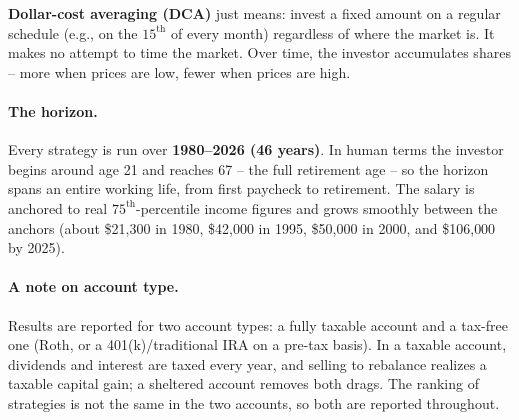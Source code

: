 \documentclass[11pt]{article}
\begin{document}
\bigskip

\textbf{Dollar-cost averaging (DCA)} just means: invest a fixed amount on a regular schedule
(e.g., on the $15^{\text{th}}$ of every month) regardless of where the market is. It makes no attempt to
time the market. Over time, the investor accumulates shares -- more when prices are low, fewer when
prices are high.

\paragraph{The horizon.} Every strategy is run over \textbf{1980--2026 (46 years)}. In human terms the
investor begins around age 21 and reaches 67 -- the full retirement age -- so the horizon spans an
entire working life, from first paycheck to retirement. The salary is anchored to real
$75^{\text{th}}$-percentile income figures and grows smoothly between the anchors (about \$21{,}300 in
1980, \$42{,}000 in 1995, \$50{,}000 in 2000, and \$106{,}000 by 2025).

\paragraph{A note on account type.} Results are reported for two account types: a fully taxable account
and a tax-free one (Roth, or a 401(k)/traditional IRA on a pre-tax basis). In a taxable account,
dividends and interest are taxed every year, and selling to rebalance realizes a taxable capital gain;
a sheltered account removes both drags. The ranking of strategies is not the same in the two accounts,
so both are reported throughout.
\end{document}
